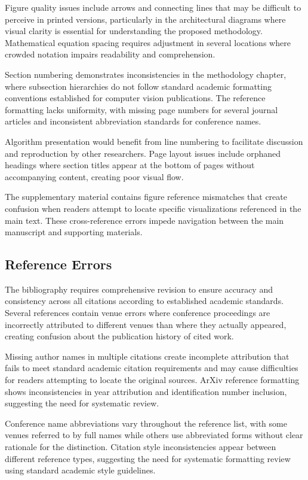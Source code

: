 Figure quality issues include arrows and connecting lines that may be difficult to perceive in printed versions, particularly in the architectural diagrams where visual clarity is essential for understanding the proposed methodology. Mathematical equation spacing requires adjustment in several locations where crowded notation impairs readability and comprehension.

Section numbering demonstrates inconsistencies in the methodology chapter, where subsection hierarchies do not follow standard academic formatting conventions established for computer vision publications. The reference formatting lacks uniformity, with missing page numbers for several journal articles and inconsistent abbreviation standards for conference names.

Algorithm presentation would benefit from line numbering to facilitate discussion and reproduction by other researchers. Page layout issues include orphaned headings where section titles appear at the bottom of pages without accompanying content, creating poor visual flow.

The supplementary material contains figure reference mismatches that create confusion when readers attempt to locate specific visualizations referenced in the main text. These cross-reference errors impede navigation between the main manuscript and supporting materials.

\subsection*{Reference Errors}
The bibliography requires comprehensive revision to ensure accuracy and consistency across all citations according to established academic standards. Several references contain venue errors where conference proceedings are incorrectly attributed to different venues than where they actually appeared, creating confusion about the publication history of cited work.

Missing author names in multiple citations create incomplete attribution that fails to meet standard academic citation requirements and may cause difficulties for readers attempting to locate the original sources. ArXiv reference formatting shows inconsistencies in year attribution and identification number inclusion, suggesting the need for systematic review.

Conference name abbreviations vary throughout the reference list, with some venues referred to by full names while others use abbreviated forms without clear rationale for the distinction. Citation style inconsistencies appear between different reference types, suggesting the need for systematic formatting review using standard academic style guidelines.

